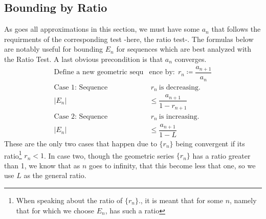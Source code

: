 \documentclass[11pt]{scrreprt}
\newcommand{\define}{\coloneqq}
\newcommand{\abs}[1]{\left| #1 \right|}
\begin{document}
	\subsection*{Bounding by Ratio}
		As goes all approximations in this section, we must have some $a_n$ that follows the requirments of the corresponding test -here, the 
		ratio test-. The formulas below are notably useful for bounding $E_n$ for sequences which are best analyzed with the Ratio Test. A last
		obvious precondition is that $a_n$ converges.
			\begin{align}
				\text{Define a new geometric sequ} &\text{ence by:} \ \ r_n \define \dfrac{a_{n+1}}{a_n} \\
					\text{Case $1$: Sequence}& \ {r_n} \ \text{is decreasing.} \\
						\abs{E_n}& \leq \dfrac{a_{n + 1}}{1 - r_{n + 1}} \\
					\text{Case $2$: Sequence}& \ {r_n} \ \text{is increasing.} \\
						\abs{E_n}& \leq \dfrac{a_{n + 1}}{1 - L}
			\end{align}
		These are the only two cases that happen due to $\{r_n\}$ being convergent if its ratio\footnote{\label{ratioNote}When speaking about the ratio 
		of $\{r_n\}.$, it is meant that for some $n$, namely that for which we choose $E_n$, has such a ratio} $r_n < 1$. In case two, 
		though the geometric series $\{r_n\}$ has a ratio greater than 1, we know that as $n$ goes to infinity, that this become less that one, so we
		use $L$ as the general ratio.
\end{document}
